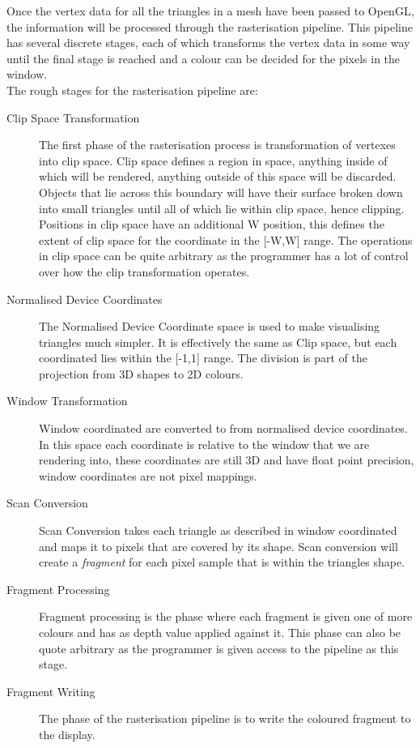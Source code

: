Once the vertex data for all the triangles in a mesh have been passed to OpenGL,
the information will be processed through the rasterisation pipeline. This 
pipeline has several discrete stages, each of which transforms the vertex data 
in some way until the final stage is reached and a colour can be decided for the
pixels in the window.\\

The rough stages for the rasterisation pipeline are:
\begin{description}
\item[Clip Space Transformation] The first phase of the rasterisation process
is transformation of vertexes into clip space. Clip space defines a region in 
space, anything inside of which will be rendered, anything outside of this space
will be discarded. Objects that lie across this boundary will have their surface
broken down into small triangles until all of which lie within clip space, hence
clipping. Positions in clip space have an additional W position, this defines the
extent of clip space for the coordinate in the [-W,W] range.
The operations in clip space can be quite arbitrary as the programmer 
has a lot of control over how the clip transformation operates.

\item[Normalised Device Coordinates] The Normalised Device Coordinate space is 
used to make visualising triangles much simpler. It is effectively the same as 
Clip space, but each coordinated lies within the [-1,1] range. The division is 
part of the projection from 3D shapes to 2D colours.
\item[Window Transformation] Window coordinated are converted to from normalised
device coordinates. In this space each coordinate is relative to the window that
we are rendering into, these coordinates are still 3D and have float point 
precision, window coordinates are not pixel mappings.
\item[Scan Conversion] Scan Conversion takes each triangle as described in 
window coordinated and maps it to pixels that are covered by its shape. Scan 
conversion will create a \emph{fragment} for each pixel sample that is within
the triangles shape.
\item[Fragment Processing] Fragment processing is the phase where each fragment 
is given one of more colours and has as depth value applied against it. This 
phase can also be quote arbitrary as the programmer is given access to the pipeline
as this stage.
\item[Fragment Writing] The phase of the rasterisation pipeline is to write the 
coloured fragment to the display.
\end{description}

